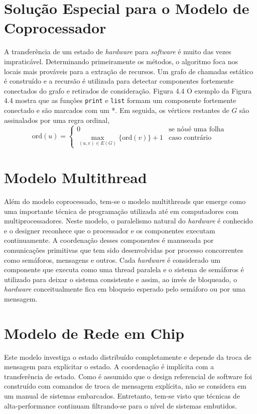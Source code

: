 \section{Solução Especial para o Modelo de Coprocessador}
A transferência de um estado de \textit{hardware} para \textit{software} é muito das vezes impraticável. Determinando primeiramente os métodos, o algoritmo foca nos locais mais prováveis para a extração de recursos. 
Um grafo de chamadas estático é construído e a recursão é utilizada para detectar componentes fortemente conectados do grafo e retirados de consideração.
Figura 4.4
O exemplo da Figura 4.4 mostra que as funções \texttt{print} e \texttt{list} formam um componente fortemente conectado e são marcados com um *. Em seguida, os vértices restantes de $ G $ são assinalados por uma regra ordinal,
$$
\text{ord}(u) = 
\left\{\begin{matrix}
0 & \text{se nó} u \text{é uma folha} \\ 
\underset{(u,v) \in E(G)}{\max} \{ \text{ord}(v) \} + 1 & \text{caso contrário}
\end{matrix}\right.
$$

\section{Modelo Multithread}
Além do modelo coprocessado, tem-se o modelo multithreads que emerge como uma importante técnica de programação utilizada até em computadores com multiprocessadores. Neste modelo, o paralelismo natural do \textit{hardware} é conhecido e o designer reconhece que o processador e os componentes executam continuamente. A coordenação desses componentes é manuseada por comunicações primitivas que tem sido desenvolvidas por processo concorrentes como semáforos, mensagens e outros. Cada \textit{hardware} é considerado um componente que executa como uma thread paralela e o sistema de semáforos é utilizado para deixar o sistema consistente e assim, ao invés de bloqueado, o \textit{hardware} conceitualmente fica em bloqueio esperado pelo semáforo ou por uma mensagem.

\section{Modelo de Rede em Chip}
Este modelo investiga o estado distribuído completamente e depende da troca de mensagem para explicitar o estado. A coordenação é implícita com a transferência de estado. Como é assumido que o design referencial de software foi construído com comandos de troca de mensagem explícita, não se considera em um manual de sistemas embarcados. Entretanto, tem-se visto que técnicas de alta-performance continuam filtrando-se para o nível de sistemas embutidos.

